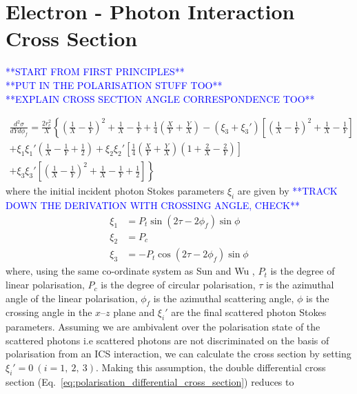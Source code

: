 \documentclass[../main.tex]{subfiles}
\begin{document}
\section{Electron - Photon Interaction Cross Section}
\label{sec:electron_photon_interaction_cross_section}

\textcolor{blue}{**START FROM FIRST PRINCIPLES** \\ **PUT IN THE POLARISATION STUFF TOO**\\ **EXPLAIN CROSS SECTION ANGLE CORRESPONDENCE TOO**}

\begin{multline}
\frac{d^{2}\sigma}{dYd\phi_{f}} = \frac{2r_{e}^{2}}{X}\left\{\left(\frac{1}{X}-\frac{1}{Y}\right)^{2}+\frac{1}{X}-\frac{1}{Y}+\frac{1}{4}\left(\frac{X}{Y}+\frac{Y}{X}\right)  -\left(\xi_{3}+\xi_{3}'\right)\left[\left(\frac{1}{X}-\frac{1}{Y}\right)^{2}+\frac{1}{X}-\frac{1}{Y}\right] \right.\\\left. +\xi_{1}\xi_{1}'\left(\frac{1}{X}-\frac{1}{Y}+\frac{1}{2}\right) + \xi_{2}\xi_{2}'\left[\frac{1}{4}\left(\frac{X}{Y}+\frac{Y}{X}\right)\left(1+\frac{2}{X}-\frac{2}{Y}\right)\right] \right.\\\left. + \xi_{3}\xi_{3}'\left[\left(\frac{1}{X}-\frac{1}{Y}\right)^{2}+\frac{1}{X}-\frac{1}{Y}+\frac{1}{2}\right] \right\}
\label{eq:polarisation_differential_cross_section}    
\end{multline}
where the initial incident photon Stokes parameters $\xi_{i}$ are given by \textcolor{blue}{**TRACK DOWN THE DERIVATION WITH CROSSING ANGLE, CHECK**}
\begin{align}
\xi_{1} &= P_{t}\sin\left(2\tau-2\phi_{f}\right)\sin\phi\\
\xi_{2} &= P_{c} \\
\xi_{3} &= -P_{t}\cos\left(2\tau-2\phi_{f}\right)\sin\phi
\label{eq:incident_stokes_parameters}    
\end{align}
where, using the same co-ordinate system as Sun and Wu \cite{sun2009characterizations,sun2011theoretical}, $P_{t}$ is the degree of linear polarisation, $P_{c}$ is the degree of circular polarisation, $\tau$ is the azimuthal angle of the linear polarisation, $\phi_{f}$ is the azimuthal scattering angle, $\phi$ is the crossing angle in the $x$--$z$ plane and $\xi_{i}'$ are the final scattered photon Stokes parameters. Assuming we are ambivalent over the polarisation state of the scattered photons i.e scattered photons are not discriminated on the basis of polarisation from an ICS interaction, we can calculate the cross section by setting $\xi_{i}' = 0 ~\left(i=1,~2,~3\right)$. Making this assumption, the double differential cross section (Eq.~\ref{eq:polarisation_differential_cross_section}) reduces to
\end{document}
